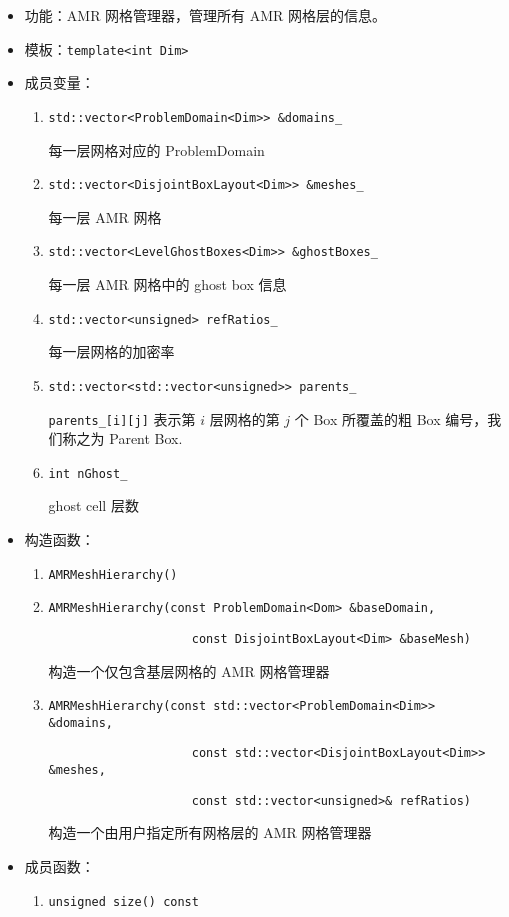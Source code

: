 \documentclass[cn, bibend=bibtex]{elegantpaper}
\theoremstyle{plain}
\begin{document}
\begin{itemize}
  \item 功能：AMR 网格管理器，管理所有 AMR 网格层的信息。
  \item 模板：\lstinline|template<int Dim>|
  \item 成员变量：
  \begin{enumerate}
    \item \lstinline|std::vector<ProblemDomain<Dim>> &domains_|

    每一层网格对应的 ProblemDomain
    \item \lstinline|std::vector<DisjointBoxLayout<Dim>> &meshes_|

    每一层 AMR 网格
    \item \lstinline|std::vector<LevelGhostBoxes<Dim>> &ghostBoxes_|

    每一层 AMR 网格中的 ghost box 信息
    \item \lstinline|std::vector<unsigned> refRatios_|

    每一层网格的加密率

    \item \lstinline|std::vector<std::vector<unsigned>> parents_|

    \lstinline|parents_[i][j]| 表示第 $i$ 层网格的第 $j$ 个 Box 所覆盖的粗 Box 编号，我们称之为 Parent Box.

    \item \lstinline|int nGhost_|

    ghost cell 层数
  \end{enumerate}
  
  \item 构造函数：
  \begin{enumerate}
    \item \lstinline|AMRMeshHierarchy()|
    \item \lstinline|AMRMeshHierarchy(const ProblemDomain<Dom> &baseDomain,|

          \lstinline|                    const DisjointBoxLayout<Dim> &baseMesh)|

          构造一个仅包含基层网格的 AMR 网格管理器
    \item \lstinline|AMRMeshHierarchy(const std::vector<ProblemDomain<Dim>> &domains,|

          \lstinline|                    const std::vector<DisjointBoxLayout<Dim>> &meshes,|

          \lstinline|                    const std::vector<unsigned>& refRatios)|

          构造一个由用户指定所有网格层的 AMR 网格管理器
  \end{enumerate}
  \item 成员函数：
  \begin{enumerate}
    \item \lstinline|unsigned size() const|


\end{enumerate}
\end{itemize}
\end{document}
